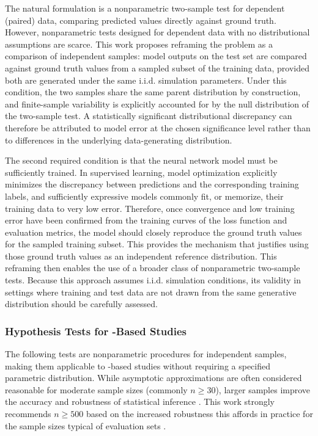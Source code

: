 The natural formulation is a nonparametric two-sample test for dependent (paired) data, comparing predicted values directly against ground truth. However, nonparametric tests designed for dependent data with no distributional assumptions are scarce. This work proposes reframing the problem as a comparison of independent samples: model outputs on the test set are compared against ground truth values from a sampled subset of the training data, provided both are generated under the same i.i.d. simulation parameters. Under this condition, the two samples share the same parent distribution by construction, and finite-sample variability is explicitly accounted for by the null distribution of the two-sample test. A statistically significant distributional discrepancy can therefore be attributed to model error at the chosen significance level rather than to differences in the underlying data-generating distribution. 

The second required condition is that the neural network model must be sufficiently trained. In supervised learning, model optimization explicitly minimizes the discrepancy between predictions and the corresponding training labels, and sufficiently expressive \DL models commonly fit, or memorize, their training data to very low error. Therefore, once convergence and low training error have been confirmed from the training curves of the loss function and evaluation metrics, the model should closely reproduce the ground truth values for the sampled training subset. This provides the mechanism that justifies using those ground truth values as an independent reference distribution. This reframing then enables the use of a broader class of nonparametric two-sample tests. Because this approach assumes i.i.d. simulation conditions, its validity in settings where training and test data are not drawn from the same generative distribution should be carefully assessed.

\subsubsection{Hypothesis Tests for \DL-Based Studies}
\label{sec:Eval:subsec:DistSim:subsubsec:hypothesis tests}
The following tests are nonparametric procedures for independent samples, making them applicable to \DL-based studies without requiring a specified parametric distribution. While asy\-mptotic approximations are often considered reasonable for moderate sample sizes (commonly $n \geq 30$), larger samples improve the accuracy and robustness of statistical inference \cite{Conover1999,Hollander2015}. This work strongly recommends $n \geq 500$ based on the increased robustness this affords in practice for the sample sizes typical of \DL evaluation sets \cite{Armstrong2019}.

